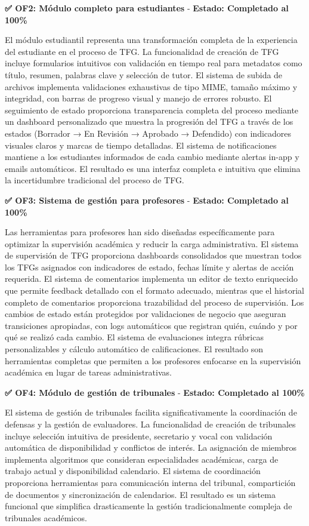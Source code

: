 \documentclass[12pt,a4paper,oneside]{report}
\begin{document}
\textbf{✅ OF2: Módulo completo para estudiantes} - \textbf{Estado: Completado al 100\%}

El módulo estudiantil representa una transformación completa de la experiencia del estudiante en el proceso de TFG. La funcionalidad de creación de TFG incluye formularios intuitivos con validación en tiempo real para metadatos como título, resumen, palabras clave y selección de tutor. El sistema de subida de archivos implementa validaciones exhaustivas de tipo MIME, tamaño máximo y integridad, con barras de progreso visual y manejo de errores robusto. El seguimiento de estado proporciona transparencia completa del proceso mediante un dashboard personalizado que muestra la progresión del TFG a través de los estados (Borrador → En Revisión → Aprobado → Defendido) con indicadores visuales claros y marcas de tiempo detalladas. El sistema de notificaciones mantiene a los estudiantes informados de cada cambio mediante alertas in-app y emails automáticos. El resultado es una interfaz completa e intuitiva que elimina la incertidumbre tradicional del proceso de TFG.

\textbf{✅ OF3: Sistema de gestión para profesores} - \textbf{Estado: Completado al 100\%}

Las herramientas para profesores han sido diseñadas específicamente para optimizar la supervisión académica y reducir la carga administrativa. El sistema de supervisión de TFG proporciona dashboards consolidados que muestran todos los TFGs asignados con indicadores de estado, fechas límite y alertas de acción requerida. El sistema de comentarios implementa un editor de texto enriquecido que permite feedback detallado con el formato adecuado, mientras que el historial completo de comentarios proporciona trazabilidad del proceso de supervisión. Los cambios de estado están protegidos por validaciones de negocio que aseguran transiciones apropiadas, con logs automáticos que registran quién, cuándo y por qué se realizó cada cambio. El sistema de evaluaciones integra rúbricas personalizables y cálculo automático de calificaciones. El resultado son herramientas completas que permiten a los profesores enfocarse en la supervisión académica en lugar de tareas administrativas.

\textbf{✅ OF4: Módulo de gestión de tribunales} - \textbf{Estado: Completado al 100\%}

El sistema de gestión de tribunales facilita significativamente la coordinación de defensas y la gestión de evaluadores. La funcionalidad de creación de tribunales incluye selección intuitiva de presidente, secretario y vocal con validación automática de disponibilidad y conflictos de interés. La asignación de miembros implementa algoritmos que consideran especialidades académicas, carga de trabajo actual y disponibilidad calendario. El sistema de coordinación proporciona herramientas para comunicación interna del tribunal, compartición de documentos y sincronización de calendarios. El resultado es un sistema funcional que simplifica drasticamente la gestión tradicionalmente compleja de tribunales académicos.
\end{document}
